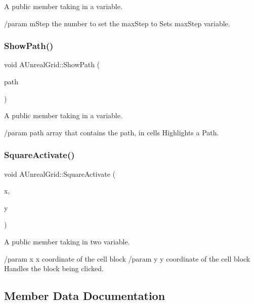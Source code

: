 A public member taking in a variable. 

/param m\+Step the number to set the max\+Step to Sets max\+Step variable. \hypertarget{class_a_unreal_grid_a4de19b986295141d8a1b31ef872a2f43}{}\label{class_a_unreal_grid_a4de19b986295141d8a1b31ef872a2f43} 
\subsubsection{\texorpdfstring{Show\+Path()}{ShowPath()}}
{\footnotesize\ttfamily void A\+Unreal\+Grid\+::\+Show\+Path (\begin{DoxyParamCaption}\item[{T\+Array$<$ \hyperlink{class_grid_pathing_cell}{Grid\+Pathing\+Cell} $>$}]{path }\end{DoxyParamCaption})}



A public member taking in a variable. 

/param path array that contains the path, in cells Highlights a Path. \hypertarget{class_a_unreal_grid_ac418fa2ea58ef9c00939f441ccdff8d4}{}\label{class_a_unreal_grid_ac418fa2ea58ef9c00939f441ccdff8d4} 
\subsubsection{\texorpdfstring{Square\+Activate()}{SquareActivate()}}
{\footnotesize\ttfamily void A\+Unreal\+Grid\+::\+Square\+Activate (\begin{DoxyParamCaption}\item[{uint32}]{x,  }\item[{uint32}]{y }\end{DoxyParamCaption})}



A public member taking in two variable. 

/param x x coordinate of the cell block /param y y coordinate of the cell block Handles the block being clicked. 

\subsection{Member Data Documentation}
\hypertarget{class_a_unreal_grid_a3c7f942498aac5d56e594f4c71be239b}{}\label{class_a_unreal_grid_a3c7f942498aac5d56e594f4c71be239b} 
